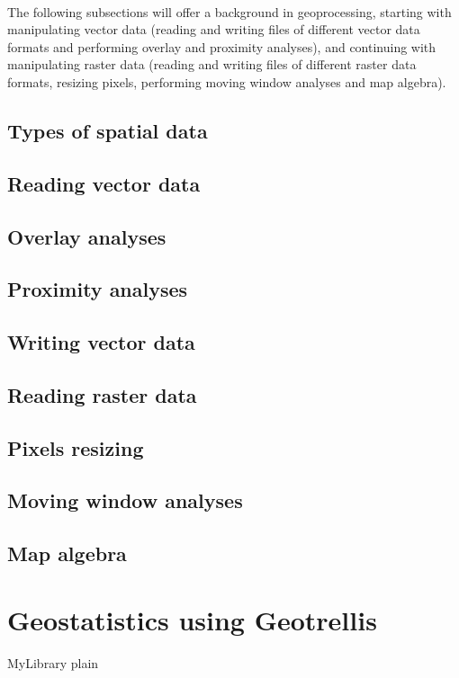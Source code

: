 \documentclass {article}
\begin{document}
\\
The following subsections will offer a background in geoprocessing, starting with manipulating vector data (reading and writing files of different vector data formats and performing overlay and proximity analyses), and continuing with manipulating raster data (reading and writing files of different raster data formats, resizing pixels, performing moving window analyses and map algebra).    

\subsection {Types of spatial data}



\subsection {Reading vector data}

\subsection {Overlay analyses}

\subsection {Proximity analyses}

\subsection {Writing vector data}

\subsection {Reading raster data}

\subsection {Pixels resizing}

\subsection {Moving window analyses}

\subsection {Map algebra}



\section {Geostatistics using Geotrellis}

 {MyLibrary}
 {plain}
\end{document}

